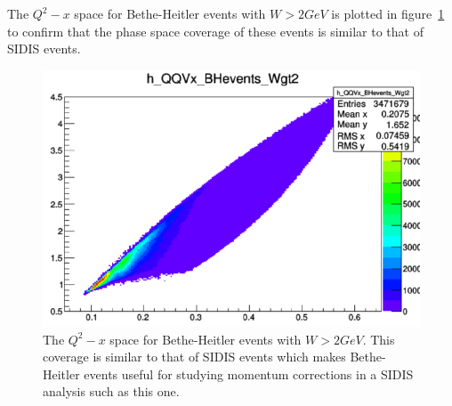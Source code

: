 The $Q^2-x$ space for Bethe-Heitler events with $W > 2 GeV$ is plotted in figure~\ref{fig:QQVx_BHevents} to confirm that the phase space coverage of these events is similar to that of SIDIS events.
%
\begin{figure}[htp]
\centering
\includegraphics[width=5in]{figures/QQVx_BHevents.png}
\caption{The $Q^2-x$ space for Bethe-Heitler events with $W > 2 GeV$. This coverage is similar to that of SIDIS events which makes Bethe-Heitler events useful for studying momentum corrections in a SIDIS analysis such as this one.}
\label{fig:QQVx_BHevents}
\end{figure}
%

